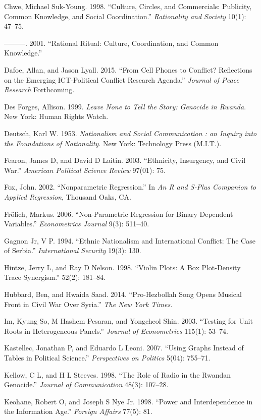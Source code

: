\documentclass[11pt,article,oneside]{memoir}
\begin{document}
Chwe, Michael Suk-Young. 1998. ``Culture, Circles, and Commercials:
Publicity, Common Knowledge, and Social Coordination.''
\emph{Rationality and Society} 10(1): 47--75.

---------. 2001. ``Rational Ritual: Culture, Coordination, and Common
Knowledge.''

Dafoe, Allan, and Jason Lyall. 2015. ``From Cell Phones to Conflict?
Reflections on the Emerging ICT-Political Conflict Research Agenda.''
\emph{Journal of Peace Research} Forthcoming.

Des Forges, Allison. 1999. \emph{Leave None to Tell the Story: Genocide
in Rwanda}. New York: Human Rights Watch.

Deutsch, Karl W. 1953. \emph{Nationalism and Social Communication : an
Inquiry into the Foundations of Nationality}. New York: Technology Press
(M.I.T.).

Fearon, James D, and David D Laitin. 2003. ``Ethnicity, Insurgency, and
Civil War.'' \emph{American Political Science Review} 97(01): 75.

Fox, John. 2002. ``Nonparametric Regression.'' In \emph{An R and S-Plus
Companion to Applied Regression}, Thousand Oaks, CA.

Fr{ö}lich, Markus. 2006. ``Non-Parametric Regression for Binary
Dependent Variables.'' \emph{Econometrics Journal} 9(3): 511--40.

Gagnon Jr, V P. 1994. ``Ethnic Nationalism and International Conflict:
The Case of Serbia.'' \emph{International Security} 19(3): 130.

Hintze, Jerry L, and Ray D Nelson. 1998. ``Violin Plots: A Box
Plot-Density Trace Synergism.'' 52(2): 181--84.

Hubbard, Ben, and Hwaida Saad. 2014. ``Pro-Hezbollah Song Opens Musical
Front in Civil War Over Syria.'' \emph{The New York Times}.

Im, Kyung So, M Hashem Pesaran, and Yongcheol Shin. 2003. ``Testing for
Unit Roots in Heterogeneous Panels.'' \emph{Journal of Econometrics}
115(1): 53--74.

Kastellec, Jonathan P, and Eduardo L Leoni. 2007. ``Using Graphs Instead
of Tables in Political Science.'' \emph{Perspectives on Politics} 5(04):
755--71.

Kellow, C L, and H L Steeves. 1998. ``The Role of Radio in the Rwandan
Genocide.'' \emph{Journal of Communication} 48(3): 107--28.

Keohane, Robert O, and Joseph S Nye Jr. 1998. ``Power and
Interdependence in the Information Age.'' \emph{Foreign Affairs} 77(5):
81.
\end{document}
